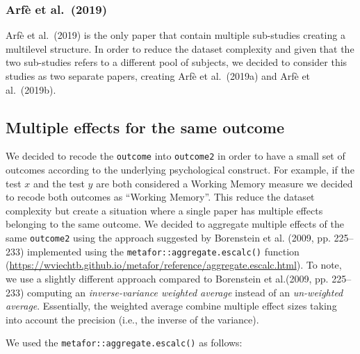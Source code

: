 \documentclass[
]{article}
\begin{document}
\hypertarget{arfuxe8-et-al.-2019}{%
\subsubsection{Arfè et al.~(2019)}\label{arfuxe8-et-al.-2019}}

Arfè et al.~(2019) is the only paper that contain multiple sub-studies creating a multilevel structure. In order to reduce the dataset complexity and given that the two sub-studies refers to a different pool of subjects, we decided to consider this studies as two separate papers, creating Arfè et al.~(2019a) and Arfè et al.~(2019b).

\hypertarget{aggregation}{%
\subsection{Multiple effects for the same outcome}\label{aggregation}}

We decided to recode the \texttt{outcome} into \texttt{outcome2} in order to have a small set of outcomes according to the underlying psychological construct. For example, if the test \(x\) and the test \(y\) are both considered a Working Memory measure we decided to recode both outcomes as ``Working Memory''.
This reduce the dataset complexity but create a situation where a single paper has multiple effects belonging to the same outcome. We decided to aggregate multiple effects of the same \texttt{outcome2} using the approach suggested by Borenstein et al. (2009, pp. 225--233) implemented using the \texttt{metafor::aggregate.escalc()} function (\url{https://wviechtb.github.io/metafor/reference/aggregate.escalc.html}).
To note, we use a slightly different approach compared to Borenstein et al.(2009, pp. 225--233) computing an \emph{inverse-variance weighted average} instead of an \emph{un-weighted average}. Essentially, the weighted average combine multiple effect sizes taking into account the precision (i.e., the inverse of the variance).

We used the \texttt{metafor::aggregate.escalc()} as follows:
\end{document}
